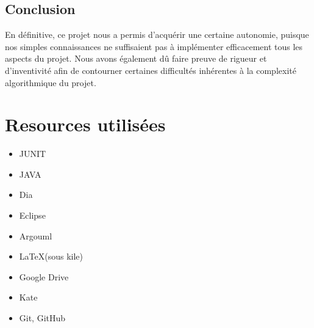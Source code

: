 ﻿\documentclass[a4paper,twoside,12pt]{report}
\begin{document}
\section{Conclusion}
%
En d\'efinitive, ce projet nous a permis d'acqu\'erir une certaine autonomie, puisque nos simples connaissances ne suffisaient pas \`a impl\'ementer efficacement tous les aspects du projet.
Nous avons \'egalement d\^u faire preuve de rigueur et d'inventivit\'e afin de contourner certaines difficult\'es inh\'erentes \`a la complexit\'e algorithmique du projet.
\chapter{Resources utilis\'ees}
\begin{itemize}
 \item JUNIT
 \item JAVA
 \item Dia
 \item Eclipse
 \item Argouml
 \item \LaTeX (sous kile)
 \item Google Drive
 \item Kate
 \item Git, GitHub
\end{itemize}
\end{document}
